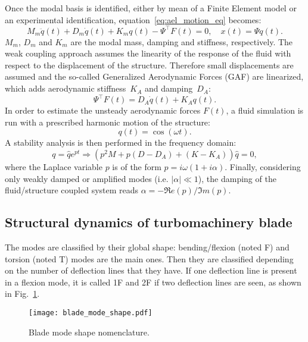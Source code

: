 Once the modal basis
is identified, either by mean of a Finite
Element model or an experimental identification, 
equation~\ref{eq:ael_motion_eq} becomes:
\begin{equation}
  \label{eq:2}
  M_m \ddot{q}(t) + D_m \dot{q}(t) + K_m q (t) - \Psi^\top F(t)=0, \quad x(t) = \Psi q(t).
\end{equation}
$M_m$, $D_m$ and $K_m$ are the modal mass, 
damping and stiffness, respectively.
The weak coupling approach assumes the linearity of the response of
the fluid with respect to the displacement of the structure. Therefore
small displacements are assumed and the so-called Generalized
Aerodynamic Forces (GAF) are linearized, which adds aerodynamic
stiffness~$K_A$ and damping~$D_A$:
\begin{equation}
  \label{eq:4}
  \Psi^\top F(t) = D_A\dot{q}(t) + K_A q(t).
\end{equation}
In order to estimate the unsteady aerodynamic forces $F(t)$, 
a fluid simulation is run with a prescribed harmonic motion of the
structure:
\begin{equation}
  \label{eq:6}
  q(t)=\cos(\omega t).
\end{equation}
A stability analysis is then performed in the frequency domain:
\begin{equation}
  \label{eq:5}
  q=\hat{q}e^{p t}\Rightarrow\left(
    p^2M + p(D-D_A) + (K-K_A)
  \right)\hat{q}=0,
\end{equation}
where the Laplace variable $p$ is of the form
$p=i\omega(1+i\alpha)$. Finally, considering only weakly damped or
amplified modes (i.e. $|\alpha| \ll 1$), the damping of the
fluid/structure coupled system reads $\alpha=-\Re e(p)/\Im m(p)$.

\subsection{Structural dynamics of turbomachinery blade}
\label{sub:structural_dynamics_of_turbomachinery_blade}

The modes are classified by their global shape: 
bending/flexion (noted F) and torsion (noted T) 
modes are the main ones. Then they are classified
depending on the number of deflection lines that they
have. If one deflection line is present in a flexion 
mode, it is called 1F and 2F if two deflection lines are
seen, as shown in Fig.~\ref{fig:blade_mode_shape}.
\begin{figure}[htp]
  \centering
  \texttt{[image: blade\_mode\_shape.pdf]}
  \caption{Blade mode shape nomenclature.}
  \label{fig:blade_mode_shape}
\end{figure}


